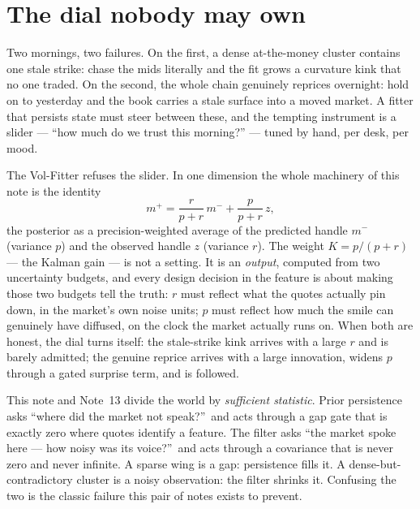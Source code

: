 \documentclass[11pt]{article}
\begin{document}
\newpage
\tableofcontents
\newpage

\section{The dial nobody may own}
\label{sec:dial}

Two mornings, two failures.  On the first, a dense at-the-money cluster
contains one stale strike: chase the mids literally and the fit grows a
curvature kink that no one traded.  On the second, the whole chain
genuinely reprices overnight: hold on to yesterday and the book carries a
stale surface into a moved market.  A fitter that persists state must
steer between these, and the tempting instrument is a slider --- ``how
much do we trust this morning?'' --- tuned by hand, per desk, per mood.

The Vol-Fitter refuses the slider.  In one dimension the whole machinery
of this note is the identity
\[
m^{+}=\frac{r}{p+r}\,m^{-}+\frac{p}{p+r}\,z ,
\]
the posterior as a precision-weighted average of the predicted handle
$m^-$ (variance $p$) and the observed handle $z$ (variance $r$).  The
weight $K=p/(p+r)$ --- the Kalman gain --- is not a setting.  It is an
\emph{output}, computed from two uncertainty budgets, and every design
decision in the feature is about making those two budgets tell the truth:
$r$ must reflect what the quotes actually pin down, in the market's own
noise units; $p$ must reflect how much the smile can genuinely have
diffused, on the clock the market actually runs on.  When both are
honest, the dial turns itself: the stale-strike kink arrives with a large
$r$ and is barely admitted; the genuine reprice arrives with a large
innovation, widens $p$ through a gated surprise term, and is followed.

\begin{heuristic}
This note and Note~13 divide the world by \emph{sufficient statistic}.
Prior persistence asks ``where did the market not speak?''\ and acts
through a gap gate that is exactly zero where quotes identify a feature.
The filter asks ``the market spoke here --- how noisy was its voice?''\
and acts through a covariance that is never zero and never infinite.  A
sparse wing is a gap: persistence fills it.  A dense-but-contradictory
cluster is a noisy observation: the filter shrinks it.  Confusing the two
is the classic failure this pair of notes exists to prevent.
\end{heuristic}
\end{document}
